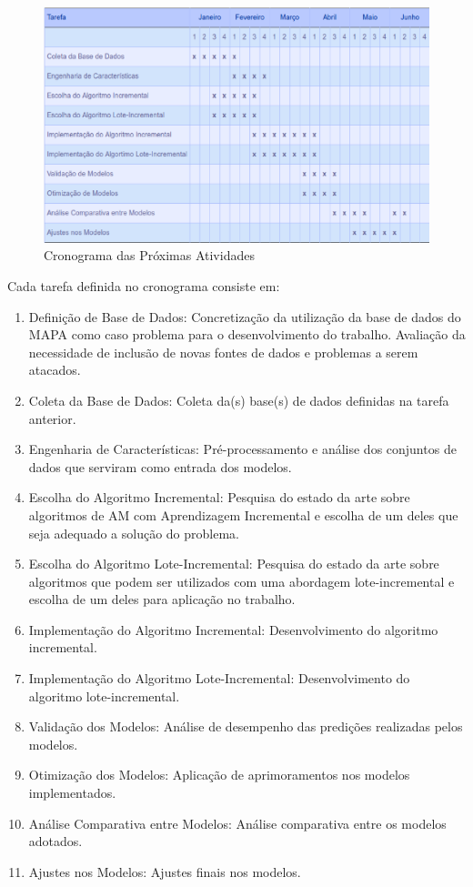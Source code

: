 \begin{figure}[!h]
\centering
\includegraphics[keepaspectratio=true,scale=0.50]
{figuras/cronograma.eps}
\caption{Cronograma das Próximas Atividades}
\label{cronograma}
\end{figure}

Cada tarefa definida no cronograma consiste em:
\begin{enumerate}
\item Definição de Base de Dados: Concretização da utilização da base de dados do MAPA como caso problema para o desenvolvimento do trabalho. Avaliação da necessidade de inclusão de novas fontes de dados e problemas a serem atacados.
\item Coleta da Base de Dados: Coleta da(s) base(s) de dados definidas na tarefa anterior.
\item Engenharia de Características: Pré-processamento e análise dos conjuntos de dados que serviram como entrada dos modelos.
\item Escolha do Algoritmo Incremental: Pesquisa do estado da arte sobre algoritmos de AM com Aprendizagem Incremental e escolha de um deles que seja adequado a solução do problema.
\item Escolha do Algoritmo Lote-Incremental: Pesquisa do estado da arte sobre algoritmos que podem ser utilizados com uma abordagem lote-incremental e escolha de um deles para aplicação no trabalho.
\item Implementação do Algoritmo Incremental: Desenvolvimento do algoritmo incremental.
\item Implementação do Algoritmo Lote-Incremental: Desenvolvimento do algoritmo lote-incremental.
\item Validação dos Modelos: Análise de desempenho das predições realizadas pelos modelos.
\item Otimização dos Modelos: Aplicação de aprimoramentos nos modelos implementados.
\item Análise Comparativa entre Modelos: Análise comparativa entre os modelos adotados.
\item Ajustes nos Modelos: Ajustes finais nos modelos.
\end{enumerate}
